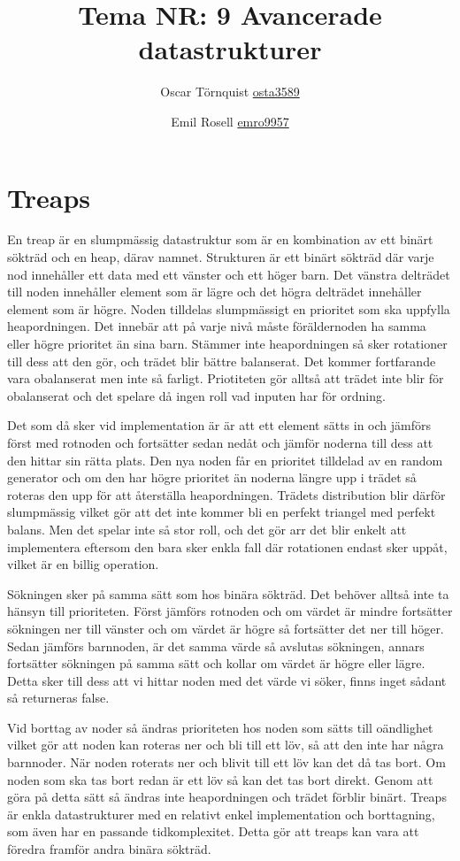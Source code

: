 \documentclass[a5paper,10pt,oneside]{article}
\title{Tema NR: 9 Avancerade datastrukturer}
\author{Oscar Törnquist \url{osta3589} \and Emil Rosell \url{emro9957}}
\begin{document}
\maketitle

\section*{Treaps}

En treap är en slumpmässig datastruktur som är en kombination av ett binärt sökträd och en heap, därav namnet. Strukturen är ett binärt sökträd där varje nod innehåller ett data med ett vänster och ett höger barn. Det vänstra delträdet till noden innehåller element som är lägre och det högra delträdet innehåller element som är högre. Noden tilldelas slumpmässigt en prioritet som ska uppfylla heapordningen. Det innebär att på varje nivå måste föräldernoden ha samma eller högre prioritet än sina barn. Stämmer inte heapordningen så sker rotationer till dess att den gör, och trädet blir bättre balanserat. Det kommer fortfarande vara obalanserat men inte så farligt. Priotiteten gör alltså att trädet inte blir för obalanserat och det spelare då ingen roll vad inputen har för ordning.

Det som då sker vid implementation är är att ett element sätts in och jämförs först med rotnoden och fortsätter sedan nedåt och jämför noderna till dess att den hittar sin rätta plats. Den nya noden får en prioritet tilldelad av en random generator och om den har högre prioritet än noderna längre upp i trädet så roteras den upp för att återställa heapordningen. Trädets distribution blir därför slumpmässig vilket gör att det inte kommer bli en perfekt triangel med perfekt balans. Men det spelar inte så stor roll, och det gör arr det blir enkelt att implementera eftersom den bara sker enkla fall där rotationen endast sker uppåt, vilket är en billig operation. 

Sökningen sker på samma sätt som hos binära sökträd. Det behöver alltså inte ta hänsyn till prioriteten. Först jämförs rotnoden och om värdet är mindre fortsätter sökningen ner till vänster och om värdet är högre så fortsätter det ner till höger. Sedan jämförs barnnoden, är det samma värde så avslutas sökningen, annars fortsätter sökningen på samma sätt och kollar om värdet är högre eller lägre. Detta sker till dess att vi hittar noden med det värde vi söker, finns inget sådant så returneras false.

Vid borttag av noder så ändras prioriteten hos noden som sätts till oändlighet vilket gör att noden kan roteras ner och bli till ett löv, så att den inte har några barnnoder. När noden roterats ner och blivit till ett löv kan det då tas bort. Om noden som ska tas bort redan är ett löv så kan det tas bort direkt. Genom att göra på detta sätt så ändras inte heapordningen och trädet förblir binärt. Treaps är enkla datastrukturer med en relativt enkel implementation och borttagning, som även har en passande tidkomplexitet. Detta gör att treaps kan vara att föredra framför andra binära sökträd.  
\end{document}
